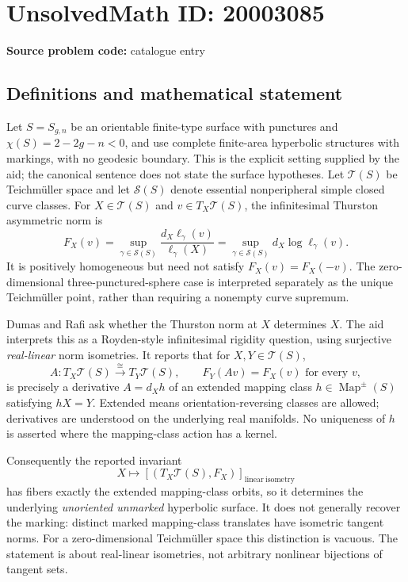\documentclass[11pt]{article}
\begin{document}
\section*{UnsolvedMath ID: 20003085}
\textbf{Source problem code:} catalogue entry
\subsection{Definitions and mathematical statement}
Let $S=S_{g,n}$ be an orientable finite-type surface with punctures and $\chi(S)=2-2g-n<0$, and use complete finite-area hyperbolic structures with markings, with no geodesic boundary. This is the explicit setting supplied by the aid; the canonical sentence does not state the surface hypotheses. Let $\mathcal T(S)$ be Teichm\"uller space and let $\mathcal S(S)$ denote essential nonperipheral simple closed curve classes. For $X\in\mathcal T(S)$ and $v\in T_X\mathcal T(S)$, the infinitesimal Thurston asymmetric norm is
\[
 F_X(v)=\sup_{\gamma\in\mathcal S(S)}
 \frac{d_X\ell_\gamma(v)}{\ell_\gamma(X)}
 =\sup_{\gamma\in\mathcal S(S)}d_X\log\ell_\gamma(v).
\]
It is positively homogeneous but need not satisfy $F_X(v)=F_X(-v)$. The zero-dimensional three-punctured-sphere case is interpreted separately as the unique Teichm\"uller point, rather than requiring a nonempty curve supremum.

Dumas and Rafi ask whether the Thurston norm at $X$ determines $X$. The aid interprets this as a Royden-style infinitesimal rigidity question, using surjective \emph{real-linear} norm isometries. It reports that for $X,Y\in\mathcal T(S)$,
\[
 A:T_X\mathcal T(S)\xrightarrow{\cong}T_Y\mathcal T(S),
 \qquad F_Y(Av)=F_X(v)\text{ for every }v,
\]
is precisely a derivative $A=d_Xh$ of an extended mapping class $h\in\operatorname{Map}^{\pm}(S)$ satisfying $hX=Y$. Extended means orientation-reversing classes are allowed; derivatives are understood on the underlying real manifolds. No uniqueness of $h$ is asserted where the mapping-class action has a kernel.

Consequently the reported invariant
\[
 X\longmapsto[(T_X\mathcal T(S),F_X)]_{\mathrm{linear\ isometry}}
\]
has fibers exactly the extended mapping-class orbits, so it determines the underlying \emph{unoriented unmarked} hyperbolic surface. It does not generally recover the marking: distinct marked mapping-class translates have isometric tangent norms. For a zero-dimensional Teichm\"uller space this distinction is vacuous. The statement is about real-linear isometries, not arbitrary nonlinear bijections of tangent sets.
\end{document}
